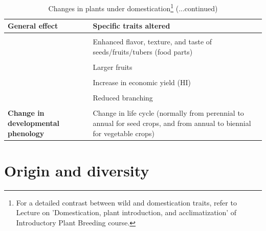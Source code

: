 \documentclass[
  ignorenonframetext,
  aspectratio=169]{beamer}
\begin{document}
\begin{frame}{}
\protect\hypertarget{section-6}{}
\begin{table}

\caption{\label{tab:domestication-syndrome2}Changes in plants under domestication\footnote[frame]{For a detailed contrast between wild and domestication traits, refer to Lecture on 'Domestication, plant introduction, and acclimatization' of Introductory Plant Breeding course.} (...continued)}
\centering
\fontsize{6}{8}\selectfont
\begin{tabular}[t]{>{\raggedright\arraybackslash}p{16em}>{\raggedright\arraybackslash}p{40em}}
\toprule
General effect & Specific traits altered\\
\midrule
\textbf{\cellcolor{gray!6}{Increased appeal to consumers}} & \cellcolor{gray!6}{Attractive fruit/seed colors and patterns}\\
\textbf{} & Enhanced flavor, texture, and taste of seeds/fruits/tubers (food parts)\\
\textbf{\cellcolor{gray!6}{}} & \cellcolor{gray!6}{Reduced toxic principles (safer food)}\\
\textbf{} & Larger fruits\\
\textbf{\cellcolor{gray!6}{}} & \cellcolor{gray!6}{Reduces spikiness}\\
\addlinespace
\textbf{} & Increase in economic yield (HI)\\
\textbf{\cellcolor{gray!6}{Altered plant architecture and growth habit}} & \cellcolor{gray!6}{Compact growth habit (Determinacy, reduced plant size, dwarfism)}\\
\textbf{} & Reduced branching\\
\textbf{\cellcolor{gray!6}{}} & \cellcolor{gray!6}{Decreases in variability within a variety}\\
\textbf{Change in developmental phenology} & Change in life cycle (normally from perennial to annual for seed crops, and from annual to biennial for vegetable crops)\\
\bottomrule
\end{tabular}
\end{table}
\end{frame}

\hypertarget{origin-and-diversity}{%
\section{Origin and diversity}\label{origin-and-diversity}}
\end{document}
